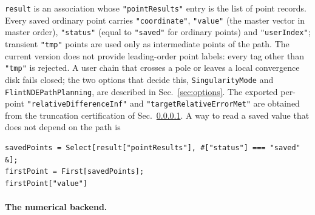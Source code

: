 \documentclass[11pt,a4paper]{article}
\begin{document}
\texttt{result} is an association whose \texttt{"pointResults"} entry is the list of point records.
Every saved ordinary point carries
\texttt{"coordinate"}, \texttt{"value"} (the master vector in master order), \texttt{"status"}
(equal to
\texttt{"saved"} for ordinary points) and \texttt{"userIndex"}; transient \texttt{"tmp"} points
are used only as intermediate points of the path. The current version does not provide leading-order
point labels: every tag other than \texttt{"tmp"} is rejected. A user chain that
crosses a pole or leaves a local convergence disk fails closed; the two options that decide this,
\texttt{SingularityMode} and \texttt{FlintNDEPathPlanning}, are described in
Sec.~\ref{sec:options}. The exported per-point
\texttt{"relativeDifferenceInf"} and \texttt{"targetRelativeErrorMet"} are obtained from the
truncation certification of Sec.~\ref{sec:backend}.
A way to read a saved value that does not depend on the path is
\begin{verbatim}
savedPoints = Select[result["pointResults"], #["status"] === "saved" &];
firstPoint = First[savedPoints];
firstPoint["value"]
\end{verbatim}

\paragraph{The numerical backend.}
\label{sec:backend}
\end{document}
